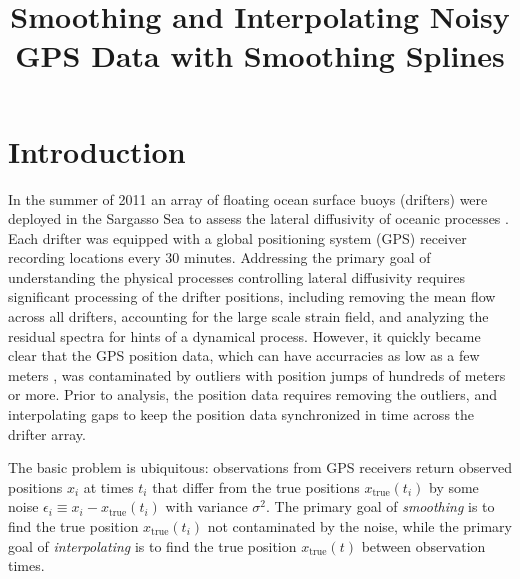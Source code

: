 \documentclass{ametsoc}
\title{Smoothing and Interpolating Noisy GPS Data with Smoothing Splines}
\affiliation{}
\begin{document}
\maketitle


%
\section{Introduction}
%
In the summer of 2011 an array of floating ocean surface buoys (drifters) were deployed in the Sargasso Sea to assess the lateral diffusivity of oceanic processes \citep{shcherbina2015-bams}. Each drifter was equipped with a global positioning system (GPS) receiver recording locations every 30 minutes.
Addressing the primary goal of understanding the physical processes controlling lateral diffusivity requires significant processing of the drifter positions, including removing the mean flow across all drifters, accounting for the large scale strain field, and analyzing the residual spectra for hints of a dynamical process. However, it quickly became clear that the GPS position data, which can have accurracies as low as a few meters \citep{faa2016-report}, was contaminated by outliers with position jumps of hundreds of meters or more. Prior to analysis, the position data requires removing the outliers, and interpolating gaps to keep the position data synchronized in time across the drifter array.

The basic problem is ubiquitous: observations from GPS receivers return observed positions $x_i$ at times $t_i$ that differ from the true positions $x_{\textrm{true}}(t_i)$ by some noise $\epsilon_i \equiv x_i - x_{\textrm{true}}(t_i)$ with variance $\sigma^2$. The primary goal of \emph{smoothing} is to find the true position $x_{\textrm{true}}(t_i)$ not contaminated by the noise, while the primary goal of \emph{interpolating} is to find the true position $x_{\textrm{true}}(t)$ between observation times.
\end{document}
